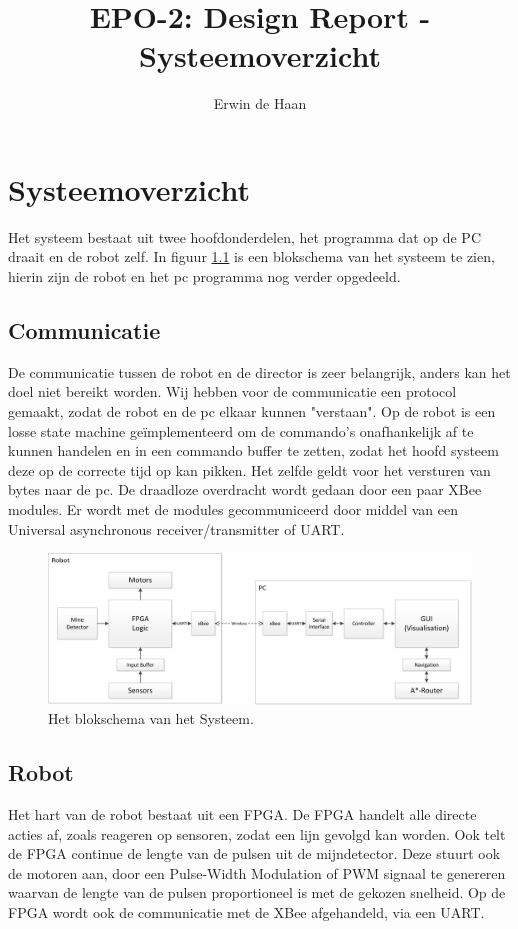 \documentclass{report}
\title{EPO-2: Design Report - Systeemoverzicht}
\author{Erwin de Haan}
\begin{document}
\chapter{Systeemoverzicht}
\label{ch:systeem}
Het systeem bestaat uit twee hoofdonderdelen, het programma dat op de PC draait en de robot zelf.
In figuur \ref{fig:topLevelSystem} is een blokschema van het systeem te zien, hierin zijn de robot en het pc programma nog verder opgedeeld. 
\section{Communicatie}
De communicatie tussen de robot en de director is zeer belangrijk, anders kan het doel niet bereikt worden.
Wij hebben voor de communicatie een protocol gemaakt, zodat de robot en de pc elkaar kunnen "verstaan".
Op de robot is een losse state machine geïmplementeerd om de commando's onafhankelijk af te kunnen handelen en in een commando buffer te zetten, zodat het hoofd systeem deze op de correcte tijd op kan pikken.
Het zelfde geldt voor het versturen van bytes naar de pc.
De draadloze overdracht wordt gedaan door een paar XBee modules.
Er wordt met de modules gecommuniceerd door middel van een Universal asynchronous receiver/transmitter of UART.
\begin{figure}
\centering
\caption{Het blokschema van het Systeem.}
\label{fig:topLevelSystem}
\includegraphics[width=\textwidth]{top-level-system}
\end{figure}
\section{Robot}
Het hart van de robot bestaat uit een FPGA.
De FPGA handelt alle directe acties af, zoals reageren op sensoren, zodat een lijn gevolgd kan worden.
Ook telt de FPGA continue de lengte van de pulsen uit de mijndetector.
Deze stuurt ook de motoren aan, door een Pulse-Width Modulation of PWM signaal te genereren waarvan de lengte van de pulsen proportioneel is met de gekozen snelheid.
Op de FPGA wordt ook de communicatie met de XBee afgehandeld, via een UART.
\end{document}
